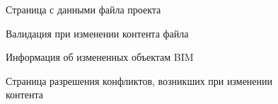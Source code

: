 \documentclass[a4paper,14pt]{extreport} %
\begin{document}
\begin{appendices}
\begin{figure}[H]
\caption{Страница с данными файла проекта}
\label{file-page}
\end{figure}
\begin{figure}[H]
\caption{Валидация при изменении контента файла}
\label{validation-content}
\end{figure}
\begin{figure}[H]
\caption{Информация об измененных объектам BIM}
\label{roots-updated}
\end{figure}
\begin{figure}[H]
\caption{Страница разрешения конфликтов, возникших при изменении контента}
\label{resolve-content}
\end{figure}

\end{appendices}
\end{document}
